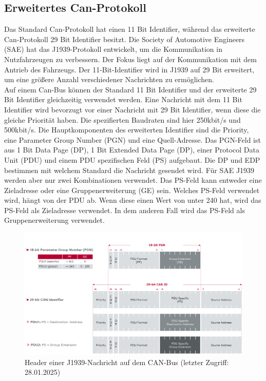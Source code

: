 \subsection{Erweitertes Can-Protokoll}
Das Standard Can-Protokoll hat einen 11 Bit Identifier, während das erweiterte Can-Protokoll 29 Bit Identifier
besitzt.
Die Society of Automotive Engineers (SAE) hat das J1939-Protokoll entwickelt, um die Kommunikation in Nutzfahrzeugen
zu verbessern. Der Fokus liegt auf der Kommunikation mit dem Antrieb des Fahrzeugs. Der 11-Bit-Identifier wird in J1939 
auf 29 Bit erweitert, um eine größere Anzahl verschiedener Nachrichten zu ermöglichen.\\
Auf einem Can-Bus können der Standard 11 Bit Identifier und der erweiterte 29 Bit Identifier gleichzeitig verwendet werden.
Eine Nachricht mit dem 11 Bit Identifier wird bevorzugt vor einer Nachricht mit 29 Bit Identifier, wenn diese die gleiche
Priorität haben. Die spezifierten Baudraten sind hier 250kbit/s und 500kbit/s. Die Hauptkomponenten des
erweiterten Identifier sind die Priority, eine Parameter Group Number (PGN) und eine Quell-Adresse.
Das PGN-Feld ist aus 1 Bit Data Page (DP), 1 Bit Extended Data Page (DP), einer Protocol Data Unit (PDU) und einem PDU spezifischen 
Feld (PS) aufgebaut. Die DP und EDP bestimmen mit welchem Standard die 
Nachricht gesendet wird. Für SAE J1939 werden aber nur zwei Kombinationen verwendet. 
Das PS-Feld kann entweder eine Zieladresse oder eine Gruppenerweiterung (GE) sein. Welches PS-Feld
verwendet wird, hängt von der PDU ab. Wenn diese einen Wert von unter 240 hat, wird das PS-Feld als Zieladresse verwendet. 
In dem anderen Fall wird das PS-Feld als Gruppenerweiterung verwendet.
\cite{Murvay2018}
\begin{figure}[H]
    \centering
    \includegraphics[scale=0.28]{images/j1939header.png}
    \caption{Header einer J1939-Nachricht auf dem CAN-Bus \cite{VectorSAE}(letzter Zugriff: 28.01.2025)}
    \label{fig:j1939header}
\end{figure}

